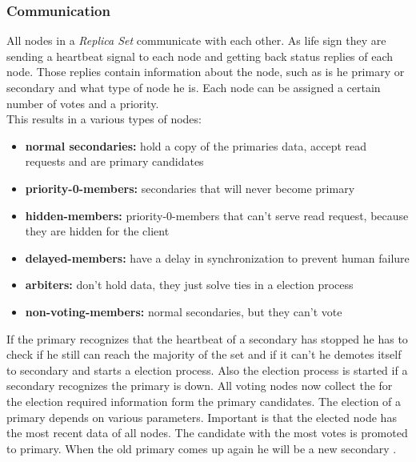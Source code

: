 \subsubsection{Communication}
All nodes in a \textit{Replica Set} communicate with each other. As life sign they are sending a heartbeat signal to each node and getting back status replies of each node. Those replies contain information about the node, such as is he primary or secondary and what type of node he is. Each node can be assigned a certain number of votes and a priority.\\
This results in a various types of nodes:
\begin{itemize}
  \item \textbf{normal secondaries:} hold a copy of the primaries data, accept read requests and are primary candidates
  \item \textbf{priority-0-members:} secondaries that will never become primary
  \item \textbf{hidden-members:} priority-0-members that can't serve read request, because they are hidden for the client
  \item \textbf{delayed-members:} have a delay in synchronization to prevent human failure
  \item \textbf{arbiters:} don't hold data, they just solve ties in a election process
  \item \textbf{non-voting-members:} normal secondaries, but they can't vote
\end{itemize}
If the primary recognizes that the heartbeat of a secondary has stopped he has to check if he still can reach the majority of the set and if it can't he demotes itself to secondary and starts a election process. Also the election process is started if a secondary recognizes the primary is down. All voting nodes now collect the for the election required information form the primary candidates. The election of a primary depends on various parameters. Important is that the elected node has the most recent data of all nodes. The candidate with the most votes is promoted to primary. When the old primary comes up again he will be a new secondary \cite{pracmong,theguide}.


